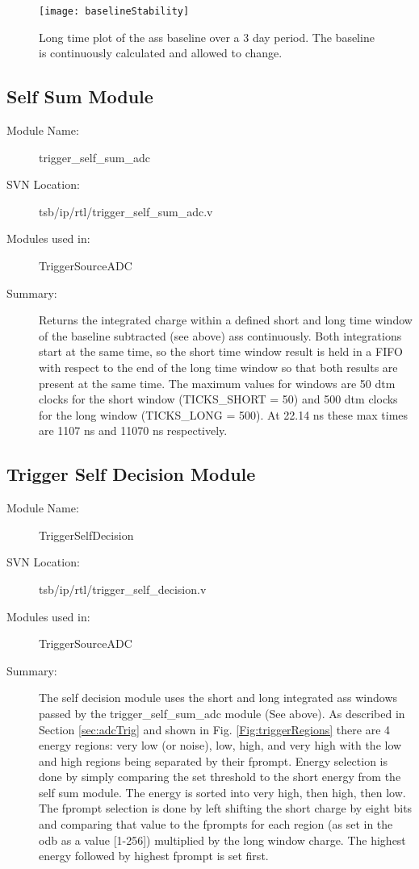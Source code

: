 		\begin{figure}[ht]
		\centering
		\texttt{[image: baselineStability]}
		\caption{Long time plot of the \gls{ass} baseline over a 3 day period. The baseline is continuously calculated and allowed to change.}
		\label{Fig:baselineStability}
		\end{figure}		
						
	
	\clearpage
	\subsection{Self Sum Module}
	\label{sec:selfSum}
	\begin{description}
	\item[Module Name:] trigger\_self\_sum\_adc
	\item[SVN Location:] tsb/ip/rtl/trigger\_self\_sum\_adc.v
	\item[Modules used in:] TriggerSourceADC
	\item[Summary:] Returns the integrated charge within a defined short and long time window of the baseline subtracted (see above) \gls{ass} continuously. Both integrations start at the same time, so the short time window result is held in a FIFO with respect to the end of the long time window so that both results are present at the same time. The maximum values for windows are 50 \gls{dtm} clocks for the short window (TICKS\_SHORT = 50) and 500 \gls{dtm} clocks for the long window (TICKS\_LONG = 500). At 22.14 ns these max times are 1107 ns and 11070 ns respectively. %
	\end{description}
	
	
	\subsection{Trigger Self Decision Module}
	\label{sec:trigSelfDecision}
	\begin{description}
	\item[Module Name:] TriggerSelfDecision
	\item[SVN Location:]  tsb/ip/rtl/trigger\_self\_decision.v
	\item[Modules used in:] TriggerSourceADC
	\item[Summary:] The self decision module uses the short and long integrated \gls{ass} windows passed by the trigger\_self\_sum\_adc module (See above). As described in Section \ref{sec:adcTrig} and shown in Fig. \ref{Fig:triggerRegions} there are 4 energy regions: very low (or noise), low, high, and very high with the low and high regions being separated by their \gls{fprompt}. Energy selection is done by simply comparing the set threshold to the short energy from the self sum module. The energy is sorted into very high, then high, then low. The \gls{fprompt} selection is done by left shifting the short charge by eight bits and comparing that value to the \gls{fprompt}s for each region (as set in the \gls{odb} as a value [1-256]) multiplied by the long window charge. The highest energy followed by highest \gls{fprompt} is set first.
	\end{description}
	
